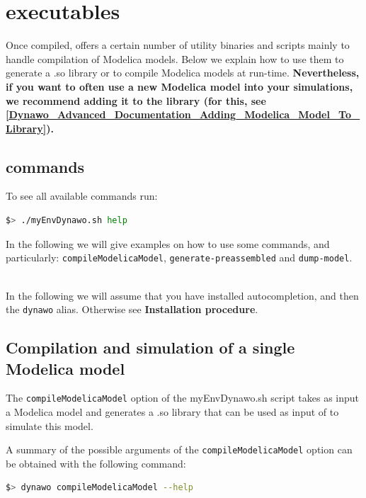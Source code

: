\documentclass[a4paper, 12pt]{report}
\begin{document}
\section[Dynawo executables]{\Dynawo executables}
\label{Dynawo_Advanced_Documentation_Dynawo_executables}

Once compiled, \Dynawo offers a certain number of utility binaries and scripts
mainly to handle compilation of Modelica models. Below we explain how to use
them to generate a .so library or to compile Modelica models at run-time.
\textbf{Nevertheless, if you want to often use a new Modelica model into your simulations, we recommend adding it to the \Dynawo library (for this, see \ref{Dynawo_Advanced_Documentation_Adding_Modelica_Model_To_Library}).} \\

\subsection[Dynawo commands]{\Dynawo commands}

To see all available \Dynawo commands run:
\begin{lstlisting}[language=bash,deletekeywords={jobs,help}]
$> ./myEnvDynawo.sh help
\end{lstlisting}

In the following we will give examples on how to use some commands, and particularly: \lstinline[language=bash]{compileModelicaModel}, \lstinline[language=bash]{generate-preassembled} and \lstinline[language=bash]{dump-model}.

~~\\
In the following we will assume that you have installed autocompletion, and then the \lstinline[language=bash]{dynawo} alias. Otherwise see \textbf{Installation procedure}.

\subsection{Compilation and simulation of a single Modelica model}

The \lstinline[language=bash]{compileModelicaModel} option of the myEnvDynawo.sh script takes as input a Modelica model and generates a .so library that can be used as input of \Dynawo to simulate this model.

A summary of the possible arguments of the \lstinline[language=bash]{compileModelicaModel} option can be obtained with the following
command:
\begin{lstlisting}[language=bash,deletekeywords={jobs,help}]
$> dynawo compileModelicaModel --help
\end{lstlisting}
\end{document}
